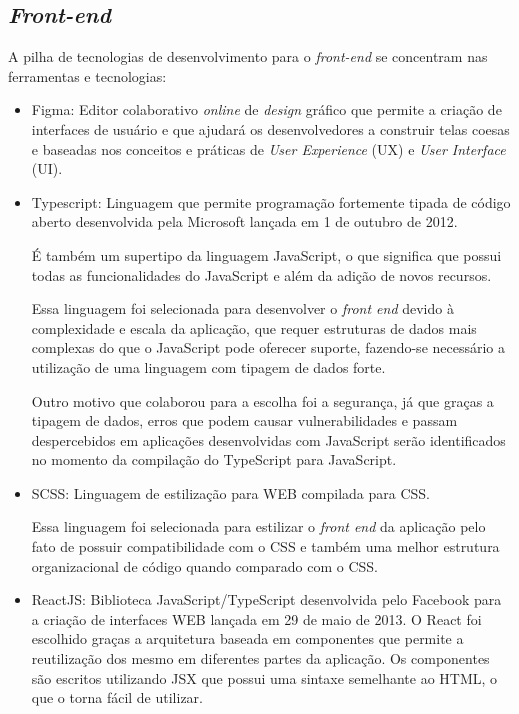 \documentclass[
    12pt,               %
    openright,          %
    oneside,
    a4paper,            %
    BIBLATEX,           %
    TODO,               %
    english,            %
    brazil              %
    ]{ifsp-spo-inf-ctds}
\begin{document}
    \subsection{\emph{Front-end}}

        A pilha de tecnologias de desenvolvimento para o \emph{front-end} se concentram nas ferramentas e tecnologias:

        \begin{itemize}

            \item Figma: Editor colaborativo \emph{online} de \emph{design} gráfico que permite a criação de interfaces de usuário e que ajudará os desenvolvedores a construir telas coesas e baseadas nos conceitos e práticas de \emph{User Experience} (UX) e \emph{User Interface} (UI).

            \item Typescript:
                Linguagem que permite programação fortemente tipada de código aberto desenvolvida pela Microsoft lançada em 1 de outubro de 2012. 

                É também um supertipo da linguagem  JavaScript, o que significa que possui todas as funcionalidades do JavaScript e além da adição de novos recursos. 

                Essa linguagem foi selecionada para desenvolver o \emph{front end} devido à complexidade e escala da aplicação, que requer estruturas de dados mais complexas do que o JavaScript pode oferecer suporte, fazendo-se necessário a utilização de uma linguagem com tipagem de dados forte. 

                Outro motivo que colaborou para a escolha foi a segurança, já que graças a tipagem de dados, erros que podem causar vulnerabilidades e passam despercebidos em aplicações desenvolvidas com JavaScript serão identificados no momento da compilação do TypeScript para JavaScript.

            \item SCSS:
                Linguagem de estilização para WEB compilada para CSS.

                Essa linguagem foi selecionada para estilizar o \emph{front end} da aplicação pelo fato de possuir compatibilidade com o CSS e também uma melhor estrutura organizacional de código quando comparado com o CSS.

            \item ReactJS:
                Biblioteca JavaScript/TypeScript desenvolvida pelo Facebook para a criação de interfaces WEB lançada em 29 de maio de 2013. O React foi escolhido graças a arquitetura baseada em componentes que permite a reutilização dos mesmo em diferentes partes da aplicação. Os componentes são escritos utilizando JSX que possui uma sintaxe semelhante ao HTML, o que o torna fácil de utilizar.


\end{itemize}
\end{document}
